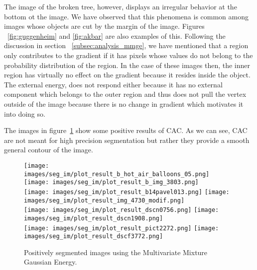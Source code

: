The image of the broken tree, however, displays an irregular behavior at the bottom ot the image. We have observed that this phenomena is common among images whose objects are cut by the margin of the image. Figures ~\ref{fig:guggenheim} and \ref{fig:akbar} are also examples of this. Following the discussion in section ~\ref{subsec:analysis_mmge}, we have mentioned that a region only contributes to the gradient if it has pixels whose values do not belong to the probability distribution of the region. In the case of these images then, the inner region has virtually no effect on the gradient because it resides inside the object. The external energy, does not respond either because it has no external component which belongs to the outer region and thus does not pull the vertex outside of the image because there is no change in gradient which motivates it into doing so.

The images in figure~\ref{fig:cac_results} show some positive results of CAC. As we can see, CAC are not meant for high precision segmentation but rather they provide a smooth general contour of the image. 

\begin{figure}[h!]
	\centering
	
	\texttt{[image: images/seg\_im/plot\_result\_b\_hot\_air\_balloons\_05.png]}\hspace{0.005\textwidth}%
	\texttt{[image: images/seg\_im/plot\_result\_b\_img\_3803.png]}\\[0.em]
	
	\texttt{[image: images/seg\_im/plot\_result\_b14pavel013.png]}\hspace{0.005\textwidth}%
	\texttt{[image: images/seg\_im/plot\_result\_img\_4730\_modif.png]}\\[0.em]
	
	\texttt{[image: images/seg\_im/plot\_result\_dscn0756.png]}\hspace{0.005\textwidth}%
	\texttt{[image: images/seg\_im/plot\_result\_dscn1908.png]}\\[0.em]
	
	\texttt{[image: images/seg\_im/plot\_result\_pict2272.png]}\hspace{0.005\textwidth}%
	\texttt{[image: images/seg\_im/plot\_result\_dscf3772.png]}\\[-0.5em]
	
	\caption{Positively segmented images using the Multivariate Mixture Gaussian Energy.}
	\label{fig:cac_results}
\end{figure}




